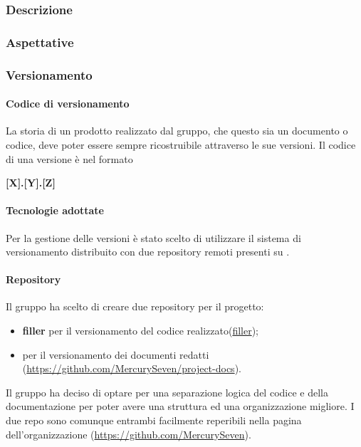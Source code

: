 \subsubsection{Descrizione}
\subsubsection{Aspettative}
\subsubsection{Versionamento}
\paragraph{Codice di versionamento}
\label{cod-versionamento}
La storia di un prodotto realizzato dal gruppo, che questo sia un documento o codice, deve poter essere sempre ricostruibile attraverso le sue versioni. Il codice di una versione è nel formato\newline
\centerline{\textbf{[X].[Y].[Z]}}\newline
\paragraph{Tecnologie adottate}
Per la gestione delle versioni è stato scelto di utilizzare il sistema di versionamento distribuito  con due repository remoti presenti su .
\paragraph{Repository}
Il gruppo \textit{\Gruppo{}} ha scelto di creare due repository per il progetto:
\begin{itemize}
	\item \textbf{filler} per il versionamento del codice realizzato(\url{filler});
	\item \textbf{\repoDoc{}} per il versionamento dei documenti redatti (\url{https://github.com/MercurySeven/project-docs}).
\end{itemize}
Il gruppo ha deciso di optare per una separazione logica del codice e della documentazione per poter avere una struttura ed una organizzazione migliore. I due repo sono comunque entrambi facilmente reperibili nella pagina dell'organizzazione (\url{https://github.com/MercurySeven}).
